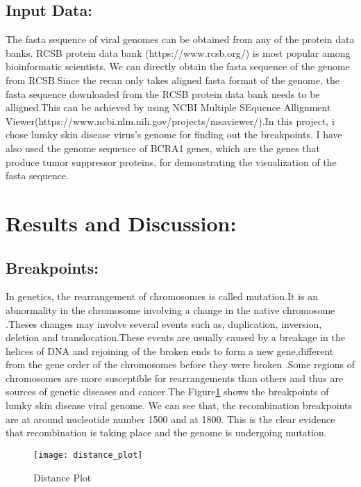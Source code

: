 \documentclass{article}
\begin{document}
\subsection{Input Data:}
The fasta sequence of viral genomes can be obtained from any of the protein data banks. RCSB protein data bank \cite{rose2016rcsb}(https://www.rcsb.org/) is most popular among bioinformatic  scientists.  We can directly obtain the fasta sequence of the genome from RCSB.Since the recan only takes aligned fasta format of the genome, the fasta sequence downloaded from the RCSB protein data bank needs to be alligned.This can be achieved by using NCBI Multiple SEquence Allignment Viewer(https://www.ncbi.nlm.nih.gov/projects/msaviewer/).In this project, i chose lumky skin disease virus's genome \cite{sprygin2018epidemiological} for finding out the breakpoints. I have also used the genome sequence of BCRA1 genes, which are the genes that produce tumor suppressor proteins, for demonstrating the visualization of the fasta sequence.

\section{Results and Discussion:}
\subsection{Breakpoints:}
In genetics, the rearrangement of chromosomes is called mutation.It is an abnormality in the chromosome involving a change in the native chromosome  \cite{zhao2012genome}.Theses changes may involve  several events such as, duplication, inversion, deletion and translocation.These events are usually caused by a breakage in the helices of DNA and rejoining of the broken ends to form a new gene,different from the gene order of the chromosomes before they were broken \cite{griffiths2002modern}.Some regions of chromosomes are more susceptible for rearrangements than others and thus are sources of genetic diseases and cancer.The Figure\ref{Figure:1} shows the breakpoints of lumky skin disease viral genome. We can see that, the recombination breakpoints are at around nucleotide number 1500 and at 1800. This is the clear evidence that recombination is taking place and the genome is undergoing mutation.

\begin{figure}
    \centering
    \texttt{[image: distance\_plot]}
    \caption{Distance Plot}
    \label{Figure:1}
\end{figure}
\end{document}
